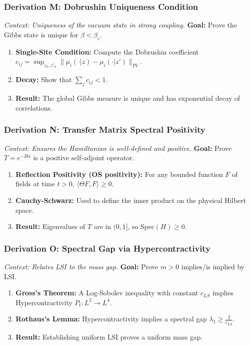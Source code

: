 \subsubsection{Derivation M: Dobrushin Uniqueness Condition}
\textit{Context: Uniqueness of the vacuum state in strong coupling.}
\textbf{Goal:} Prove the Gibbs state is unique for $\beta < \beta_c$.
\begin{enumerate}
    \item \textbf{Single-Site Condition:} Compute the Dobrushin coefficient $c_{ij} = \sup_{z_k, z'_k} \| \mu_i(\cdot | z) - \mu_i(\cdot | z') \|_{TV}$.
    \item \textbf{Decay:} Show that $\sum_j c_{ij} < 1$.
    \item \textbf{Result:} The global Gibbs measure is unique and has exponential decay of correlations.
\end{enumerate}

\subsubsection{Derivation N: Transfer Matrix Spectral Positivity}
\textit{Context: Ensures the Hamiltonian is well-defined and positive.}
\textbf{Goal:} Prove $T = e^{-H a}$ is a positive self-adjoint operator.
\begin{enumerate}
    \item \textbf{Reflection Positivity (OS positivity):} For any bounded function $F$ of fields at time $t>0$, $\langle \Theta F, F \rangle \ge 0$.
    \item \textbf{Cauchy-Schwarz:} Used to define the inner product on the physical Hilbert space.
    \item \textbf{Result:} Eigenvalues of $T$ are in $(0, 1]$, so Spec$(H) \ge 0$.
\end{enumerate}

\subsubsection{Derivation O: Spectral Gap via Hypercontractivity}
\textit{Context: Relates LSI to the mass gap.}
\textbf{Goal:} Prove $m > 0$ implies/is implied by LSI.
\begin{enumerate}
    \item \textbf{Gross's Theorem:} A Log-Sobolev inequality with constant $c_{LS}$ implies Hypercontractivity $P_t: L^2 \to L^4$.
    \item \textbf{Rothaus's Lemma:} Hypercontractivity implies a spectral gap $\lambda_1 \ge \frac{2}{c_{LS}}$.
    \item \textbf{Result:} Establishing uniform LSI proves a uniform mass gap.
\end{enumerate}


